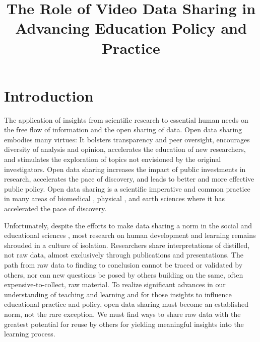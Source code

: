 \documentclass[letterpaper,man,apacite]{apa6}
\title{The Role of Video Data Sharing in Advancing Education Policy and Practice}
\begin{document}
\maketitle

\section{Introduction}

The application of insights from scientific research to essential human needs on the free flow of information and the open sharing of data. 
Open data sharing embodies many virtues: It bolsters transparency and peer oversight, encourages diversity of analysis and opinion, accelerates the education of new researchers, and stimulates the exploration of topics not envisioned by the original investigators.
Open data sharing increases the impact of public investments in research, accelerates the pace of discovery, and leads to better and more effective public policy.
Open data sharing is a scientific imperative \cite{NSF2011,NIMH2015} and common practice in many areas of biomedical \cite{Kaye2009}, physical \cite{Young2011}, and earth sciences \cite{Kleiner2011} where it has accelerated the pace of discovery.

Unfortunately, despite the efforts to make data sharing a norm in the social and educational sciences \cite{AERA-Code-2011, Nosek2012}, most research on human development and learning \cite{Adolph2012} remains shrouded in a culture of isolation. 
Researchers share interpretations of distilled, not raw data, almost exclusively through publications and presentations.
The path from raw data to finding to conclusion cannot be traced or validated by others, nor can new questions be posed by others building on the same, often expensive-to-collect, raw material.
To realize significant advances in our understanding of teaching and learning and for those insights to influence educational practice and policy, open data sharing must become an established norm, not the rare exception.
We must find ways to share raw data with the greatest potential for reuse by others for yielding meaningful insights into the learning process.
\end{document}
